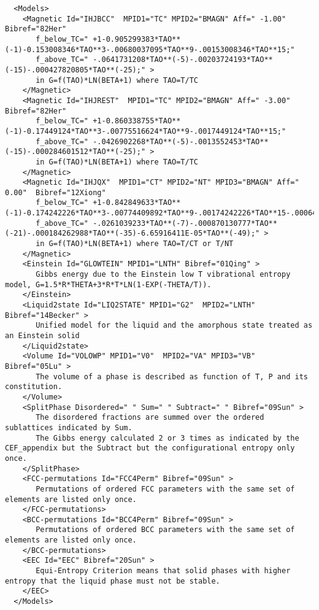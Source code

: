 \documentclass{article}
\begin{document}
\begin{appendices}
{\small
\begin{verbatim}
  <Models>
    <Magnetic Id="IHJBCC"  MPID1="TC" MPID2="BMAGN" Aff=" -1.00" Bibref="82Her" 
       f_below_TC=" +1-0.905299383*TAO**(-1)-0.153008346*TAO**3-.00680037095*TAO**9-.00153008346*TAO**15;"
       f_above_TC=" -.0641731208*TAO**(-5)-.00203724193*TAO**(-15)-.000427820805*TAO**(-25);" > 
       in G=f(TAO)*LN(BETA+1) where TAO=T/TC
    </Magnetic>
    <Magnetic Id="IHJREST"  MPID1="TC" MPID2="BMAGN" Aff=" -3.00" Bibref="82Her"
       f_below_TC=" +1-0.860338755*TAO**(-1)-0.17449124*TAO**3-.00775516624*TAO**9-.0017449124*TAO**15;"
       f_above_TC=" -.0426902268*TAO**(-5)-.0013552453*TAO**(-15)-.000284601512*TAO**(-25);" >
       in G=f(TAO)*LN(BETA+1) where TAO=T/TC
    </Magnetic>
    <Magnetic Id="IHJQX"  MPID1="CT" MPID2="NT" MPID3="BMAGN" Aff=" 0.00"  Bibref="12Xiong"
       f_below_TC=" +1-0.842849633*TAO**(-1)-0.174242226*TAO**3-.00774409892*TAO**9-.00174242226*TAO**15-.000646538871*TAO**21;"
       f_above_TC=" -.0261039233*TAO**(-7)-.000870130777*TAO**(-21)-.000184262988*TAO**(-35)-6.65916411E-05*TAO**(-49);" >
       in G=f(TAO)*LN(BETA+1) where TAO=T/CT or T/NT
    </Magnetic>
    <Einstein Id="GLOWTEIN" MPID1="LNTH" Bibref="01Qing" > 
       Gibbs energy due to the Einstein low T vibrational entropy model, G=1.5*R*THETA+3*R*T*LN(1-EXP(-THETA/T)).
    </Einstein>
    <Liquid2state Id="LIQ2STATE" MPID1="G2"  MPID2="LNTH" Bibref="14Becker" >
       Unified model for the liquid and the amorphous state treated as an Einstein solid
    </Liquid2state>
    <Volume Id="VOLOWP" MPID1="V0"  MPID2="VA" MPID3="VB" Bibref="05Lu" >
       The volume of a phase is described as function of T, P and its constitution.
    </Volume>
    <SplitPhase Disordered=" " Sum=" " Subtract=" " Bibref="09Sun" >
       The disordered fractions are summed over the ordered sublattices indicated by Sum.
       The Gibbs energy calculated 2 or 3 times as indicated by the CEF_appendix but the Subtract but the configurational entropy only once.
    </SplitPhase>
    <FCC-permutations Id="FCC4Perm" Bibref="09Sun" >
       Permutations of ordered FCC parameters with the same set of elements are listed only once.
    </FCC-permutations>
    <BCC-permutations Id="BCC4Perm" Bibref="09Sun" >
       Permutations of ordered BCC parameters with the same set of elements are listed only once.
    </BCC-permutations>
    <EEC Id="EEC" Bibref="20Sun" >
       Equi-Entropy Criterion means that solid phases with higher entropy that the liquid phase must not be stable.
    </EEC>
  </Models>
\end{verbatim}
}


\end{appendices}
\end{document}
